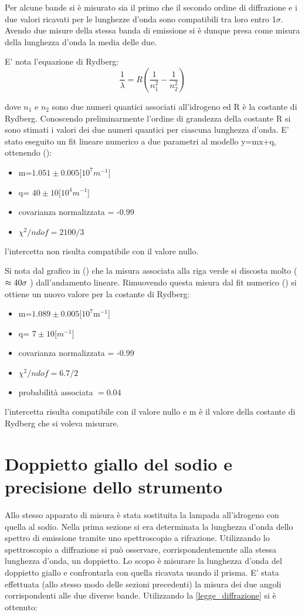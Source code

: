 Per alcune bande si è misurato sia il primo che il secondo ordine di diffrazione e i due valori ricavati per le lunghezze d'onda sono compatibili tra loro entro 1$\sigma$. Avendo due misure della stessa banda di emissione si è dunque presa come misura della lunghezza d'onda la media delle due.

E' nota l'equazione di Rydberg:
\begin{equation}
\frac{1}{\lambda} = R (\frac{1}{n_{1}^2} - \frac{1}{n_{2}^2})
\end{equation} 

dove $n_1$ e $n_2$  sono due numeri quantici associati all'idrogeno ed R è la costante di Rydberg. Conoscendo preliminarmente l'ordine di grandezza della costante R si sono stimati i valori dei due numeri quantici per ciascuna lunghezza d'onda. E' stato eseguito un fit lineare numerico a due parametri al modello y=mx+q, ottenendo (): 
\begin{itemize}
\item	m=$1.051\pm0.005$[$10^{7} m^{-1}$]
\item	q= $40 \pm 10$[$10^{4} m^{-1}$]
\item	covarianza normalizzata = -0.99
\item	$\chi^{2}/ndof= 2100/3$
\end{itemize}

l'intercetta non risulta compatibile con il valore nullo.

Si nota dal grafico in () che la misura associata alla riga verde si discosta molto ( $ \approx 40\space \sigma$ ) dall'andamento lineare. Rimuovendo questa misura dal fit numerico () si ottiene un nuovo valore per la costante di Rydberg:
\begin{itemize}
\item	m=$1.089\pm0.005$[$10^{7}$m$^{-1}$]
\item	q= $7 \pm 10$[$m^{-1}$]
\item	covarianza normalizzata = -0.99
\item	$\chi^{2}/ndof= 6.7/2$
\item	probabilità associata $= 0.04$
\end{itemize}
l'intercetta risulta compatibile con il valore nullo e m è il valore della costante di Rydberg che si voleva misurare.

\section{Doppietto giallo del sodio e precisione dello strumento}
Allo stesso apparato di misura è stata sostituita la lampada all'idrogeno con quella al sodio. Nella prima sezione si era determinata la lunghezza d'onda dello spettro di emissione tramite uno spettroscopio a rifrazione. Utilizzando lo spettroscopio a diffrazione si può osservare, corrispondentemente alla stessa lunghezza d'onda, un doppietto. Lo scopo è misurare la lunghezza d'onda del doppietto giallo e confrontarla con quella ricavata usando il prisma.
E' stata effettuata (allo stesso modo delle sezioni precedenti) la misura dei due angoli corrispondenti alle due diverse bande. Utilizzando la \ref{legge_diffrazione} si è ottenuto:

